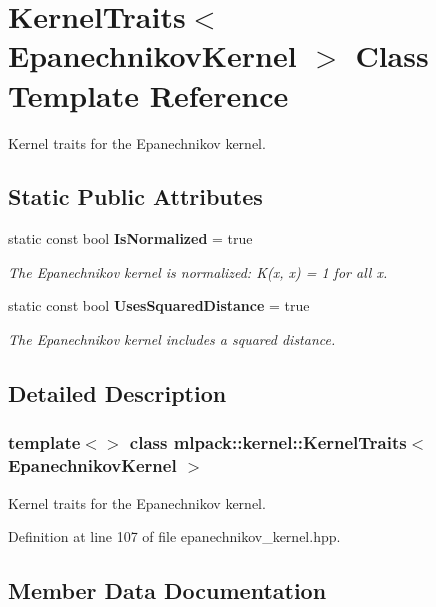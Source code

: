 \section{Kernel\+Traits$<$ Epanechnikov\+Kernel $>$ Class Template Reference}
\label{classmlpack_1_1kernel_1_1KernelTraits_3_01EpanechnikovKernel_01_4}


Kernel traits for the Epanechnikov kernel.  


\subsection*{Static Public Attributes}
\begin{DoxyCompactItemize}
\item 
static const bool \textbf{ Is\+Normalized} = true
\begin{DoxyCompactList}\small\item\em The Epanechnikov kernel is normalized\+: K(x, x) = 1 for all x. \end{DoxyCompactList}\item 
static const bool \textbf{ Uses\+Squared\+Distance} = true
\begin{DoxyCompactList}\small\item\em The Epanechnikov kernel includes a squared distance. \end{DoxyCompactList}\end{DoxyCompactItemize}


\subsection{Detailed Description}
\subsubsection*{template$<$$>$\newline
class mlpack\+::kernel\+::\+Kernel\+Traits$<$ Epanechnikov\+Kernel $>$}

Kernel traits for the Epanechnikov kernel. 

Definition at line 107 of file epanechnikov\+\_\+kernel.\+hpp.



\subsection{Member Data Documentation}
\mbox{\label{classmlpack_1_1kernel_1_1KernelTraits_3_01EpanechnikovKernel_01_4_a213c74e1e7c01890b64c8b9e88f8c0dc}} 

